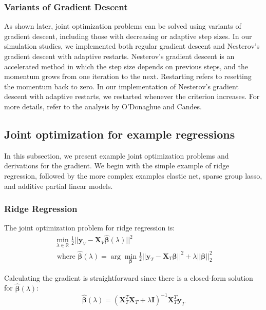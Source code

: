 \documentclass[10pt,letterpaper]{article}
\begin{document}
\subsubsection{Variants of Gradient Descent}

As shown later, joint optimization problems can be solved using variants of gradient descent, including those with decreasing or adaptive step sizes. In our simulation studies, we implemented both regular gradient descent and Nesterov's gradient descent with adaptive restarts. Nesterov's gradient descent is an accelerated method in which the step size depends on previous steps, and the momentum grows from one iteration to the next. Restarting refers to resetting the momentum back to zero. In our implementation of Nesterov's gradient descent with adaptive restarts, we restarted whenever the criterion increases. For more details, refer to the analysis by O'Donaghue and Candes.

\subsection{Joint optimization for example regressions}

In this subsection, we present example joint optimization problems and derivations for the gradient. We begin with the simple example of ridge regression, followed by the more complex examples elastic net, sparse group lasso, and additive partial linear models.

\subsubsection{Ridge Regression}

The joint optimization problem for ridge regression is:
\begin{equation}
\begin{array}{c}
\min_{\lambda\in \mathbb{R}} \frac{1}{2} \lvert\lvert \boldsymbol{y}_V - \boldsymbol{X}_V \hat{\boldsymbol{\beta}} (\lambda) \rvert\rvert ^2 \\
\text{  where  } \hat{\boldsymbol{\beta}} (\lambda) = \arg \min_{\boldsymbol{\beta}} \frac{1}{2} \lvert\lvert \boldsymbol{y}_T - \boldsymbol{X}_T \boldsymbol{\beta} \rvert\rvert ^2 + \lambda \lvert\lvert \boldsymbol{\beta} \rvert\rvert_2^2
\end{array}
\end{equation}

Calculating the gradient is straightforward since there is a closed-form solution for $\hat{\boldsymbol{\beta}}(\lambda)$:
\begin{equation}
\hat{\boldsymbol{\beta}} (\lambda) = (\boldsymbol{X}_T^T\boldsymbol{X}_T + \lambda \boldsymbol{I})^{-1}\boldsymbol{X}_T^T\boldsymbol{y}_T
\end{equation}
\end{document}
